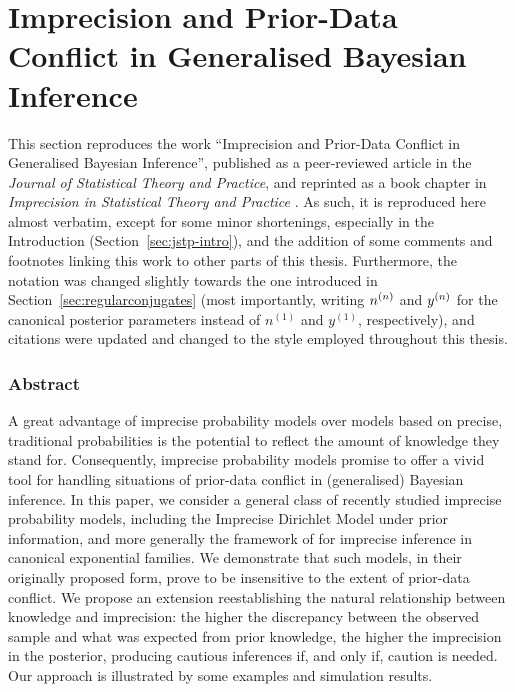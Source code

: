 \section{Imprecision and Prior-Data Conflict in Generalised Bayesian Inference}
\label{sec:jstp}


This section reproduces the work
``Imprecision and Prior-Data Conflict in Generalised Bayesian Inference'',
published as a peer-reviewed article in the \emph{Journal of Statistical Theory and Practice},
and reprinted as a book chapter in \emph{Imprecision in Statistical Theory and Practice}
\parencite{Walter2009a}.
As such, it is reproduced here almost verbatim,
except for some minor shortenings, especially in the Introduction (Section~\ref{sec:jstp-intro}),
and the addition of some comments and footnotes linking this work to other parts of this thesis.
Furthermore, the notation was changed slightly towards the one introduced in Section~\ref{sec:regularconjugates}
(most importantly, writing $n^{(n)}$ and $y^{(n)}$ for the canonical posterior parameters
instead of $n^{(1)}$ and $y^{(1)}$, respectively),
and citations were updated and changed to the style employed throughout this thesis.

\subsubsection*{Abstract}

A great advantage of imprecise probability models over models
based on precise, traditional probabilities is the potential to
reflect the amount of knowledge they stand for. Consequently,
imprecise probability models promise to offer a vivid tool for
handling situations of prior-data conflict in (generalised) Bayesian
inference. In this paper, we consider a general class of recently
studied imprecise probability models, including the Imprecise
Dirichlet Model \parencite[IDM,][]{1996:walley::idm} under prior information, and more generally the
framework of \textcite{2005:quaeghebeurcooman} for imprecise inference in
canonical exponential families. We demonstrate that such models, in
their originally proposed form, prove to be insensitive to the
extent of prior-data conflict. We propose an extension
reestablishing the natural relationship between knowledge and
imprecision: the higher the discrepancy between the observed sample
and what was expected from prior knowledge, the higher the
imprecision in the posterior, producing cautious inferences if, and
only if, caution is needed. Our approach is illustrated by some
examples and simulation results.


